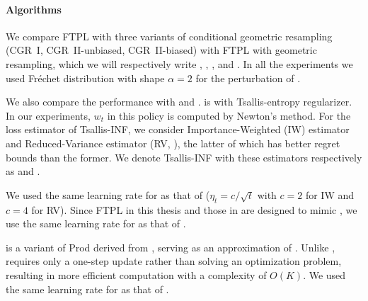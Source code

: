 \paragraph{Algorithms}
We compare FTPL with three variants of conditional geometric resampling
(CGR~I, CGR~II-unbiased, CGR~II-biased) with FTPL with geometric resampling,
which we will respectively write
\CGRI, \CGRIIU, \CGRIIB, and \GR.
In all the experiments we used Fr\'{e}chet distribution with shape $\alpha = 2$ for the perturbation of {}.




We also compare the performance with {} and {}. 
{} is {} with Tsallis-entropy regularizer. 
In our experiments, $w_t$ in this policy is computed by Newton's method. 
For the loss estimator of Tsallis-INF,
we consider Importance-Weighted (IW) estimator and Reduced-Variance estimator (RV, \citealp{JMLR:v22:19-753}), the latter of
which has better regret bounds than the former.
We denote Tsallis-INF with these estimators respectively as {} and {}.

We used the same learning rate for {} as that of \citet{JMLR:v22:19-753}
($\eta_t=c/\sqrt{t}$ with $c=2$ for IW and $c=4$ for RV).
Since FTPL in this thesis and those in \citet{pmlr-v247-lee24a, pmlr-v201-honda23a} are designed to mimic {},
we use the same learning rate for {} as that of {}.

{} is a variant of Prod \citep{cesa2007improved} derived from {}, serving as an approximation of {}. Unlike {}, {} requires only a one-step update rather than solving an optimization problem, resulting in more efficient computation with a complexity of $O(K)$. We used the same learning rate for {} as that of \citet{zimmertproductive}.



